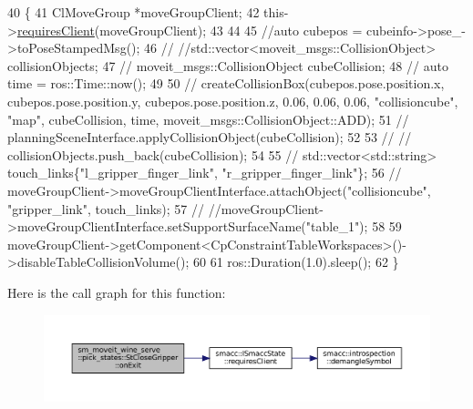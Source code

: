 \begin{DoxyCode}
40          \{
41             ClMoveGroup *moveGroupClient;
42             this->\hyperlink{classsmacc_1_1ISmaccState_a7f95c9f0a6ea2d6f18d1aec0519de4ac}{requiresClient}(moveGroupClient);
43 
44 
45             \textcolor{comment}{//auto cubepos = cubeinfo->pose\_->toPoseStampedMsg();}
46             \textcolor{comment}{// //std::vector<moveit\_msgs::CollisionObject> collisionObjects;}
47             \textcolor{comment}{// moveit\_msgs::CollisionObject cubeCollision;}
48             \textcolor{comment}{// auto time = ros::Time::now();}
49 
50             \textcolor{comment}{// createCollisionBox(cubepos.pose.position.x, cubepos.pose.position.y,
       cubepos.pose.position.z, 0.06, 0.06, 0.06, "collisioncube", "map",  cubeCollision, time, moveit\_msgs::CollisionObject::ADD);}
51             \textcolor{comment}{// planningSceneInterface.applyCollisionObject(cubeCollision);}
52 
53             \textcolor{comment}{// // collisionObjects.push\_back(cubeCollision);}
54             
55             \textcolor{comment}{// std::vector<std::string> touch\_links\{"l\_gripper\_finger\_link", "r\_gripper\_finger\_link"\};}
56             \textcolor{comment}{// moveGroupClient->moveGroupClientInterface.attachObject("collisioncube", "gripper\_link",
       touch\_links);}
57             \textcolor{comment}{// //moveGroupClient->moveGroupClientInterface.setSupportSurfaceName("table\_1");}
58             
59             moveGroupClient->getComponent<CpConstraintTableWorkspaces>()->disableTableCollisionVolume();
60 
61             ros::Duration(1.0).sleep();
62          \}
\end{DoxyCode}
Here is the call graph for this function\+:
\nopagebreak
\begin{figure}[H]
\begin{center}
\leavevmode
\includegraphics[width=350pt]{structsm__moveit__wine__serve_1_1pick__states_1_1StCloseGripper_a91c1dc598d520be23e00c7ce38aac23e_cgraph}
\end{center}
\end{figure}
\mbox{\label{structsm__moveit__wine__serve_1_1pick__states_1_1StCloseGripper_aa0c212f289581355c56da5bbfc97a5a7}} 
